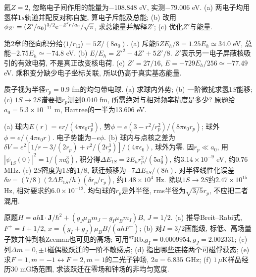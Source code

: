 \begin{exercise}氦$Z=2$, 忽略电子间作用的能量为$-108.848$ eV, 实测$-79.006$ eV. (a) 两电子均用氢样$1s$轨道并配反对称自旋, 算电子斥能及总能; (b) 改用$\phi_{Z'}=(Z'/a_0)^{3/2}\mathrm e^{-Z'r/a_0}/\sqrt\pi$, 求总能量并解释$Z'$; (c) 优化$Z'$与能量.\end{exercise}
\begin{solution}第2章的径向积分给$\langle1/r_{12}\rangle=5Z/(8a_0)$. (a) 斥能$5ZE_h/8=1.25E_h\simeq34.0$ eV, 总能$-2.75E_h\simeq-74.8$ eV. (b) $E/E_h=Z'^2-4Z'+5Z'/8$. $Z'$表示另一电子屏蔽核吸引的有效电荷, 不是真正改变核电荷. (c) $Z'=27/16$, $E=-729E_h/256\simeq-77.49$ eV. 乘积变分缺少电子坐标关联, 所以仍高于真实基态能量.
\end{solution}

\begin{exercise}质子视为半径$r_p=0.9$ fm的均匀带电球. (a) 求球内外势; (b) 一阶微扰求氢$1S$能移; (c) $1S\!\to2S$谱要把$r_p$测到$0.010$ fm, 所需绝对与相对频率精度是多少? 原题给$a_0=5.3\times10^{-11}$ m, Hartree的一半为13.606 eV.\end{exercise}
\begin{solution}(a) 球内$E(r)=er/(4\pi\epsilon_0r_p^3)$, 势$\phi=e(3-r^2/r_p^2)/(8\pi\epsilon_0r_p)$; 球外$\phi=e/(4\pi\epsilon_0r)$. 电子势能为$-e\phi$. (b) 球内与点核之差为$\delta V=e^2[1/r-3/(2r_p)+r^2/(2r_p^3)]/(4\pi\epsilon_0)$, 球外为零. 因$r_p\ll a_0$, 用$|\psi_{1S}(0)|^2=1/(\pi a_0^3)$, 积分得$\Delta E_{1S}=2E_h r_p^2/(5a_0^2)$, 约$3.14\times10^{-9}$ eV, 约$0.76$ MHz. (c) $2S$密度为$1S$的$1/8$, 跃迁频移为$-7\Delta E_{1S}/(8h)$. 对半径线性化误差$\delta\nu=(7/8)(2\Delta E_{1S}/h)(\delta r_p/r_p)$, 约$1.48\times10^4$ Hz. 除以$1S\!\to2S$约$2.47\times10^{15}$ Hz, 相对要求约$6.0\times10^{-12}$. 均匀球的$r_p$是外半径, rms半径为$\sqrt{3/5}r_p$, 不应把二者混用.
\end{solution}
\begin{exercise}原题$H=ah\mathbf I\cdot\mathbf J/\hbar^2+(g_J\mu_Bm_J-g_I\mu_Bm_I)B$, $J=1/2$. (a) 推导Breit--Rabi式, $F^+=I+1/2$, $x=(g_I+g_J)\mu_BB/(ahF^+)$; (b) 对$I=3/2$画能级, 标低、高场量子数并伸到核Zeeman也可见的高场; 可用$^{87}$Rb,$g_I=0.0009954,g_J=2.002331$; (c) 列$\Delta m=0,\pm1$磁偶极跃迁的一阶不敏感点; (d) 指出哪些连接两个可磁俘获态; (e) 求$F=1,m=-1\leftrightarrow F=2,m=1$的二光子钟场, $2a=6.835$ GHz; (f) $1\,\mu$K样品经历30 mG场范围, 求该跃迁在零场和钟场的非均匀宽度.\end{exercise}
